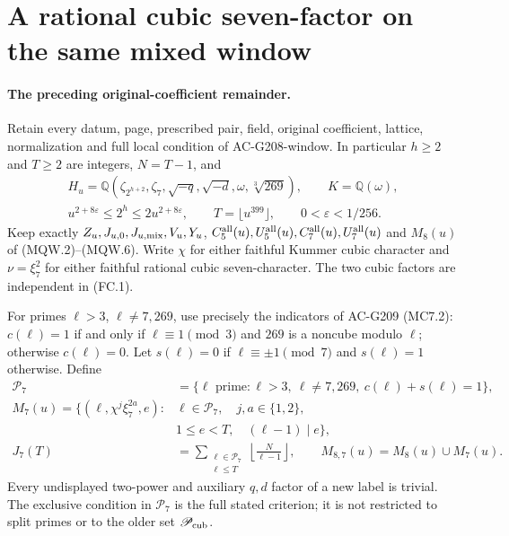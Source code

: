 \section{A rational cubic seven-factor on the same mixed window}
\label{sec:mixed-cubic-seven-window}

\paragraph{The preceding original-coefficient remainder.}
Retain every datum, page, prescribed pair, field, original coefficient,
lattice, normalization and full local condition of AC-G208-window.
In particular $h\geq2$ and $T\geq2$ are integers, $N=T-1$, and
\[
 \begin{gathered}
 H_u=\mathbb Q(\zeta_{2^{h+2}},\zeta_7,\sqrt{-q},\sqrt{-d},
                  \omega,\sqrt[3]{269}),\qquad K=\mathbb Q(\omega),\\
 u^{2+8\varepsilon}\leq2^h\leq2u^{2+8\varepsilon},\qquad
 T=\lfloor u^{399}\rfloor,\qquad0<\varepsilon<1/256.
 \end{gathered}\tag{MC7W.1}
\]
Keep exactly $Z_u,J_{u,0},J_{u,\rm mix},V_u,Y_u$,
$C_5^{\rm all}(u),U_5^{\rm all}(u),C_7^{\rm all}(u),U_7^{\rm all}(u)$
and $M_8(u)$ of (MQW.2)--(MQW.6).
Write $\chi$ for either faithful Kummer cubic character and
$\nu=\xi_7^2$ for either faithful rational cubic seven-character.
The two cubic factors are independent in (FC.1).

For primes $\ell>3$, $\ell\ne7,269$, use precisely the
indicators of AC-G209 (MC7.2): $c(\ell)=1$ if and only if
$\ell\equiv1\pmod3$ and $269$ is a noncube modulo $\ell$;
otherwise $c(\ell)=0$. Let $s(\ell)=0$ if
$\ell\equiv\pm1\pmod7$ and $s(\ell)=1$ otherwise.
Define
\[
 \begin{split}
 \mathscr P_7&=\{\ell\text{ prime}:\ell>3,\ \ell\ne7,269,
                                      \ c(\ell)+s(\ell)=1\},\\
 M_7(u)=\{(\ell,\chi^j\xi_7^{2a},e):{}&\ell\in\mathscr P_7,
                         \quad j,a\in\{1,2\},\\
                         &1\leq e<T,\quad(\ell-1)\mid e\},\\
 J_7(T)&=\sum_{\substack{\ell\in\mathscr P_7\\\ell\leq T}}
                       \left\lfloor\frac{N}{\ell-1}\right\rfloor,
 \qquad M_{8,7}(u)=M_8(u)\cup M_7(u).
 \end{split}\tag{MC7W.2}
\]
Every undisplayed two-power and auxiliary $q,d$ factor of a
new label is trivial. The exclusive condition in $\mathscr P_7$
is the full stated criterion; it is not restricted to split primes
or to the older set $\mathscr P_{\rm cub}$.

